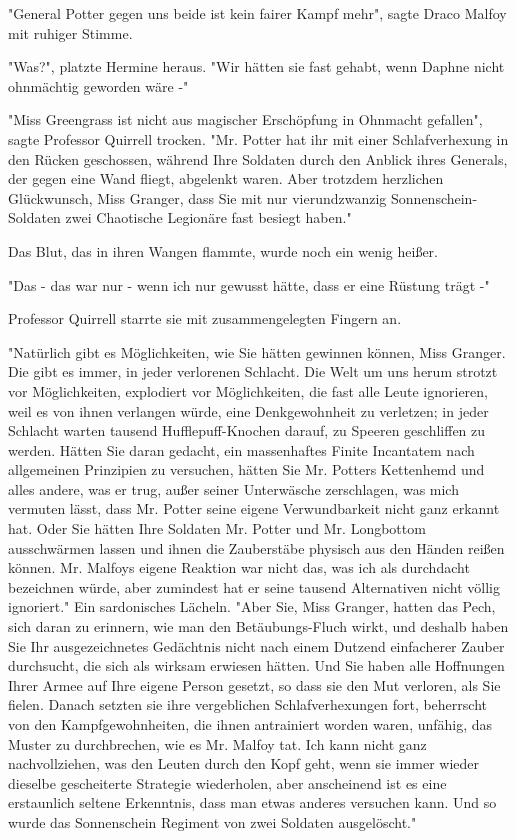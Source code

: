 {"General Potter gegen uns beide ist kein fairer Kampf mehr", sagte Draco Malfoy mit ruhiger Stimme.

"Was?", platzte Hermine heraus. "Wir hätten sie fast gehabt, wenn Daphne nicht ohnmächtig geworden wäre -"

"Miss Greengrass ist nicht aus magischer Erschöpfung in Ohnmacht gefallen", sagte Professor Quirrell trocken. "Mr. Potter hat ihr mit einer Schlafverhexung in den Rücken geschossen, während Ihre Soldaten durch den Anblick ihres Generals, der gegen eine Wand fliegt, abgelenkt waren. Aber trotzdem herzlichen Glückwunsch, Miss Granger, dass Sie mit nur vierundzwanzig Sonnenschein-Soldaten zwei Chaotische Legionäre fast besiegt haben."

Das Blut, das in ihren Wangen flammte, wurde noch ein wenig heißer.

"Das - das war nur - wenn ich nur gewusst hätte, dass er eine Rüstung trägt -"

Professor Quirrell starrte sie mit zusammengelegten Fingern an.

"Natürlich gibt es Möglichkeiten, wie Sie hätten gewinnen können, Miss Granger. Die gibt es immer, in jeder verlorenen Schlacht. Die Welt um uns herum strotzt vor Möglichkeiten, explodiert vor Möglichkeiten, die fast alle Leute ignorieren, weil es von ihnen verlangen würde, eine Denkgewohnheit zu verletzen; in jeder Schlacht warten tausend Hufflepuff-Knochen darauf, zu Speeren geschliffen zu werden. Hätten Sie daran gedacht, ein massenhaftes Finite Incantatem nach allgemeinen Prinzipien zu versuchen, hätten Sie Mr. Potters Kettenhemd und alles andere, was er trug, außer seiner Unterwäsche zerschlagen, was mich vermuten lässt, dass Mr. Potter seine eigene Verwundbarkeit nicht ganz erkannt hat. Oder Sie hätten Ihre Soldaten Mr. Potter und Mr. Longbottom ausschwärmen lassen und ihnen die Zauberstäbe physisch aus den Händen reißen können. Mr. Malfoys eigene Reaktion war nicht das, was ich als durchdacht bezeichnen würde, aber zumindest hat er seine tausend Alternativen nicht völlig ignoriert." Ein sardonisches Lächeln. "Aber Sie, Miss Granger, hatten das Pech, sich daran zu erinnern, wie man den Betäubungs-Fluch wirkt, und deshalb haben Sie Ihr ausgezeichnetes Gedächtnis nicht nach einem Dutzend einfacherer Zauber durchsucht, die sich als wirksam erwiesen hätten. Und Sie haben alle Hoffnungen Ihrer Armee auf Ihre eigene Person gesetzt, so dass sie den Mut verloren, als Sie fielen. Danach setzten sie ihre vergeblichen Schlafverhexungen fort, beherrscht von den Kampfgewohnheiten, die ihnen antrainiert worden waren, unfähig, das Muster zu durchbrechen, wie es Mr. Malfoy tat. Ich kann nicht ganz nachvollziehen, was den Leuten durch den Kopf geht, wenn sie immer wieder dieselbe gescheiterte Strategie wiederholen, aber anscheinend ist es eine erstaunlich seltene Erkenntnis, dass man etwas anderes versuchen kann. Und so wurde das Sonnenschein Regiment von zwei Soldaten ausgelöscht."

}

